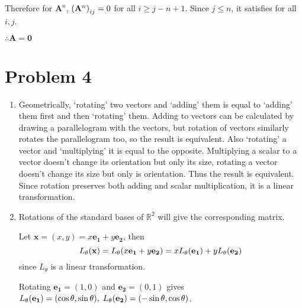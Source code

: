 \documentclass[10pt]{article}
\begin{document}
Therefore for $\mathbf{A}^{n}$, $\qty(\mathbf{A}^{n})_{ij} = 0$ for all $i \geq j - n + 1$. Since $j \leq n$, it satisfies for all $i, j$. 
\vspace{3mm}

$\therefore \mathbf{A} = \mathbf{0}$

\section*{Problem 4}
\begin{enumerate}[leftmargin=*, label={(\alph*)}]
    \item Geometrically, `rotating' two vectors and `adding' them is equal to `adding' them first and then `rotating' them.
    Adding to vectors can be calculated by drawing a parallelogram with the vectors, but rotation of vectors similarly rotates the parallelogram too, so the result is equivalent.
    Also `rotating' a vector and `multiplying' it is equal to the opposite.
    Multiplying a scalar to a vector doesn't change its orientation but only its size, rotating a vector doesn't change its size but only is orientation. Thus the result is equivalent.
    Since rotation preserves both adding and scalar multiplication, it is a linear transformation.
    \item Rotations of the standard bases of $\mathbb{R}^2$ will give the corresponding matrix.
    \vspace{2mm}

    Let $\mathbf{x} = (x, y) = x\mathbf{e_1} + y\mathbf{e_2}$, then
    $$L_\theta(\mathbf{x}) = L_\theta\qty(x\mathbf{e_1} + y\mathbf{e_2}) = xL_\theta\qty(\mathbf{e_1}) + yL_\theta\qty(\mathbf{e_2})$$
    since $L_\theta$ is a linear transformation.
    \vspace{2mm}

    Rotating $\mathbf{e_1} = (1, 0)$ and $\mathbf{e_2} = (0, 1)$ gives $L_\theta\qty(\mathbf{e_1}) = (\cos\theta, \sin\theta), \; L_\theta\qty(\mathbf{e_2}) = (-\sin\theta, \cos\theta)$.
    \vspace{2mm}


\end{enumerate}
\end{document}
